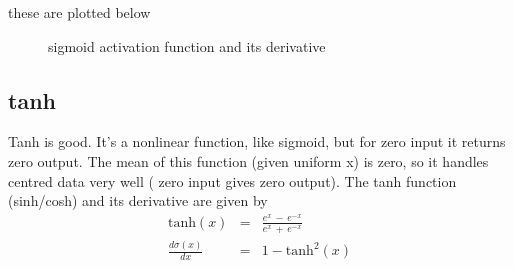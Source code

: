 \documentclass{article}
\begin{document}
these are plotted below
\begin{figure}[tb]
\begin{centering}
\end{centering}
\caption{sigmoid activation function and its derivative}

\end{figure}

\subsection{tanh}
Tanh is good. It's a nonlinear function, like sigmoid, but for zero input it returns zero output. The mean of this function (given uniform x) is zero, so it handles centred data very well ( zero input gives zero output).
The tanh function (sinh/cosh) and its derivative are given by
\begin{eqnarray*}
\mathrm{tanh}(x) & = &\frac{e^x\,-\, e^{-x}}{e^x\,+\, e^{-x}} \\
\frac{d\sigma(x)}{dx} & = & 1 - \mathrm{tanh}^2(x) 
\end{eqnarray*}
\end{document}
